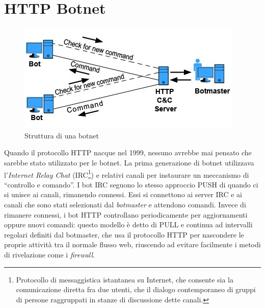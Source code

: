 \section{HTTP Botnet}
\begin{figure}[h]
        \centering
		\includegraphics[width=0.5\linewidth]{./imgs/botnet1999}
        \caption{Struttura di una botnet}
        \label{strutturabotnet}
\end{figure}
Quando il protocollo HTTP nacque nel 1999, nessuno avrebbe mai pensato che sarebbe stato utilizzato per le botnet. 
La prima generazione di botnet utilizzava l'\textit{Internet Relay Chat} (IRC\footnote{Protocollo di messaggistica istantanea su Internet, che consente sia la comunicazione diretta fra due utenti, che il dialogo contemporaneo di gruppi di persone raggruppati in stanze di discussione dette canali.}) e relativi canali per instaurare un meccanismo di ``controllo e comando''. I bot IRC seguono lo stesso approccio PUSH di quando ci si unisce ai canali, rimanendo connessi. Essi si connettono ai server IRC e ai canali che sono stati selezionati dal \textit{botmaster} e attendono comandi. 
Invece di rimanere connessi, i bot HTTP controllano periodicamente per aggiornamenti oppure nuovi comandi: questo modello \`e detto di PULL e continua ad intervalli regolari definiti dal botmaster, che usa il protocollo HTTP per nascondere le proprie attivit\`{a} tra il normale flusso web, riuscendo ad evitare facilmente i metodi di rivelazione come i \textit{firewall}. 

\vspace*{1cm}
